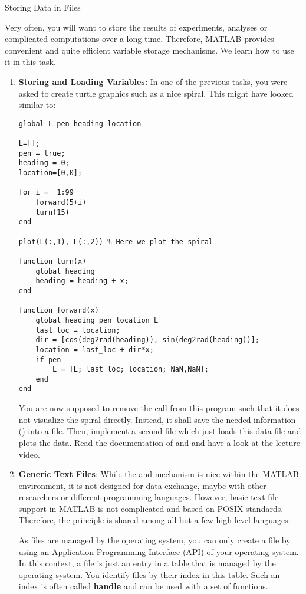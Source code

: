 \begin{task}{Storing Data in Files}{}{}
  
  Very often, you will want to store the results of experiments, analyses or complicated computations over a long time.
  Therefore, MATLAB provides convenient and quite efficient variable storage mechanisms. We learn how to use it in this task.
  
  \begin{enumerate}

  \item{\textbf{Storing and Loading Variables:} In one of the previous tasks, you were asked to create turtle graphics such as
    a nice spiral. This might have looked similar to:

\begin{lstlisting}
global L pen heading location

L=[];
pen = true;
heading = 0;
location=[0,0];

for i =  1:99
	forward(5+i)
	turn(15)
end

plot(L(:,1), L(:,2)) % Here we plot the spiral

function turn(x)
	global heading
	heading = heading + x;
end

function forward(x)
	global heading pen location L
	last_loc = location;
	dir = [cos(deg2rad(heading)), sin(deg2rad(heading))];
	location = last_loc + dir*x;
	if pen
		L = [L; last_loc; location; NaN,NaN];
	end
end

\end{lstlisting}

You are now supposed to remove the  call from this program such that it does not visualize the spiral directly. Instead,
it shall save the needed information () into a file. Then, implement a second file which just loads this data file and plots the data. Read the documentation of  and  and have a look at the lecture video.
}


  \item{\textbf{Generic Text Files\up{+}}: While the  and  mechanism is nice within the MATLAB environment, it is not designed for data exchange, maybe with other researchers or different programming languages. However, basic text file support in MATLAB is not complicated and based on POSIX standards. Therefore, the principle is shared among all but a few high-level languages:

    As files are managed by the operating system, you can only create a file by using an Application Programming Interface (API) of
    your operating system. In this context, a file is just an entry in a table that is managed by the operating system. You identify files by their index in this table. Such an index is often called \textbf{handle} and can be used with a set of functions.

}
\end{enumerate}
\end{task}
